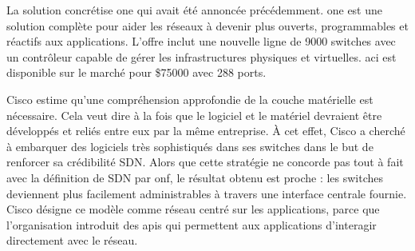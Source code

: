 La solution concrétise \gls{one} qui avait été annoncée précédemment. \gls{one} est une solution complète pour aider les réseaux à devenir plus ouverts, programmables et réactifs aux applications. L'offre inclut une nouvelle ligne de 9000 switches avec un contrôleur capable de gérer les infrastructures physiques et virtuelles. \gls{aci} est disponible sur le marché pour \$75000 avec 288 ports. \cite{CiscoInsiemeLast}




Cisco estime qu'une compréhension approfondie de la couche matérielle est nécessaire. Cela veut dire à la fois que le logiciel et le matériel devraient être développés  et reliés entre eux par la même entreprise. À cet effet, Cisco a cherché à embarquer des logiciels très sophistiqués dans ses switches dans le but de renforcer sa crédibilité SDN.
Alors que cette stratégie ne concorde pas tout à fait avec la définition de SDN par \gls{onf}, le résultat obtenu est proche : les switches deviennent plus facilement administrables à travers une interface centrale fournie. Cisco désigne ce modèle comme réseau centré sur les applications, parce que l'organisation introduit des \glspl{api} qui permettent aux applications d'interagir directement avec le réseau. \cite{CiscoSDNONE}




